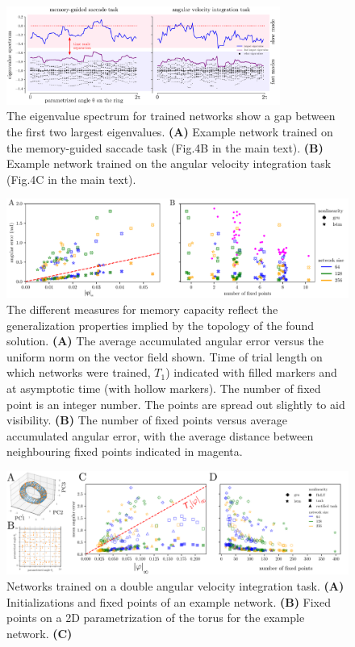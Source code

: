 \documentclass[letterpaper]{article}
\begin{document}
\begin{figure}[tbhp]
  \centering
  \includegraphics[width=0.8\textwidth]{eigenvalue_gap}
  \caption{The eigenvalue spectrum for  trained networks  show a gap between the first two largest eigenvalues.
    \textbf{(A)} Example network trained on the memory-guided saccade task (Fig.4B in the main text).
    \textbf{(B)}  Example network trained on the angular velocity integration task (Fig.4C in the main text).
}\label{fig:eigenvalue_gap}
\end{figure}


\begin{figure}[tbhp]
  \centering
  \includegraphics[width=\textwidth]{angular_losses_lstm_gru}
  \caption{The different measures for memory capacity reflect the generalization properties implied by the topology of the found solution.
    \textbf{(A)} The average accumulated angular error versus the uniform norm on the vector field shown.
     Time of trial length on which networks were trained, \(T_1\)) indicated with filled markers and at asymptotic time (with hollow markers).
      The number of fixed point is an integer number. The points are spread out slightly to aid visibility.
    \textbf{(B)}  The number of fixed points versus average accumulated angular error, with the average distance between neighbouring fixed points indicated in magenta.
}\label{fig:angular_losses_lstm_gru}
\end{figure}


\begin{figure}[tbhp]
  \centering
  \includegraphics[width=\textwidth]{davit}
  \caption{Networks trained on a double angular velocity integration task.
    \textbf{(A)} Initializations and fixed points of an example network.
    \textbf{(B)} Fixed points on a 2D parametrization of the torus for the example network.
    \textbf{(C)} 
}\label{fig:davit}
\end{figure}
\end{document}

